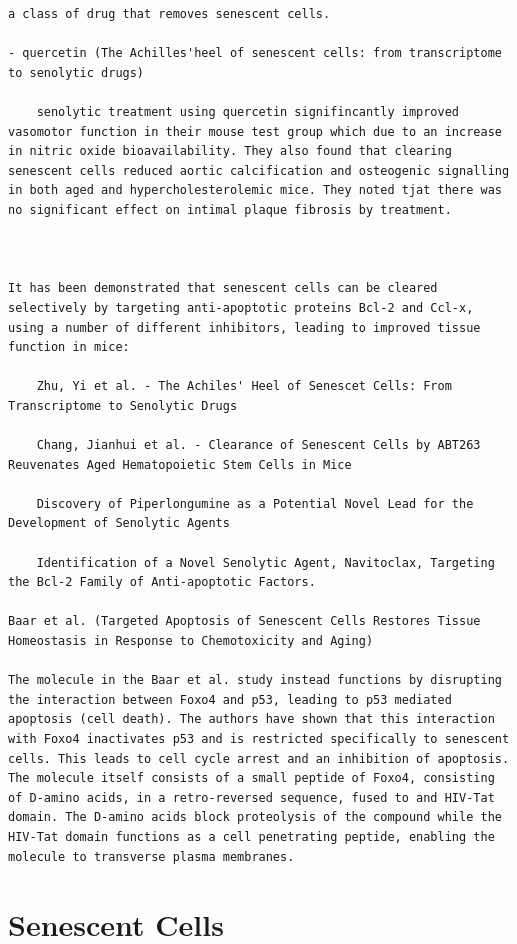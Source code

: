 \documentclass[
]{book}
\begin{document}
\begin{verbatim}
a class of drug that removes senescent cells.

- quercetin (The Achilles'heel of senescent cells: from transcriptome to senolytic drugs)

    senolytic treatment using quercetin signifincantly improved vasomotor function in their mouse test group which due to an increase in nitric oxide bioavailability. They also found that clearing senescent cells reduced aortic calcification and osteogenic signalling in both aged and hypercholesterolemic mice. They noted tjat there was no significant effect on intimal plaque fibrosis by treatment.



It has been demonstrated that senescent cells can be cleared selectively by targeting anti-apoptotic proteins Bcl-2 and Ccl-x, using a number of different inhibitors, leading to improved tissue function in mice:

    Zhu, Yi et al. - The Achiles' Heel of Senescet Cells: From Transcriptome to Senolytic Drugs

    Chang, Jianhui et al. - Clearance of Senescent Cells by ABT263 Reuvenates Aged Hematopoietic Stem Cells in Mice

    Discovery of Piperlongumine as a Potential Novel Lead for the Development of Senolytic Agents

    Identification of a Novel Senolytic Agent, Navitoclax, Targeting the Bcl-2 Family of Anti-apoptotic Factors.

Baar et al. (Targeted Apoptosis of Senescent Cells Restores Tissue Homeostasis in Response to Chemotoxicity and Aging)

The molecule in the Baar et al. study instead functions by disrupting the interaction between Foxo4 and p53, leading to p53 mediated apoptosis (cell death). The authors have shown that this interaction with Foxo4 inactivates p53 and is restricted specifically to senescent cells. This leads to cell cycle arrest and an inhibition of apoptosis. The molecule itself consists of a small peptide of Foxo4, consisting of D-amino acids, in a retro-reversed sequence, fused to and HIV-Tat domain. The D-amino acids block proteolysis of the compound while the HIV-Tat domain functions as a cell penetrating peptide, enabling the molecule to transverse plasma membranes.
\end{verbatim}

\hypertarget{senescent-cells}{%
\section{Senescent Cells}\label{senescent-cells}}
\end{document}
